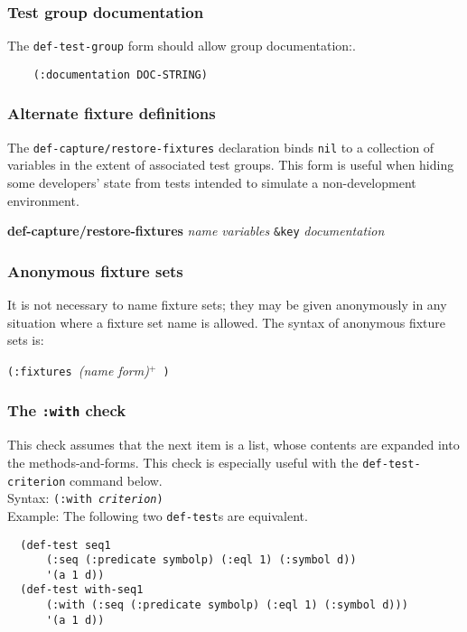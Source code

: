 \subsubsection{Test group documentation}
The \texttt{def-test-group} form should allow group
documentation:.
\begin{verbatim}
    (:documentation DOC-STRING)
\end{verbatim}

\subsubsection{Alternate fixture definitions}
The
\texttt{def-capture/restore-fixtures}
declaration binds \texttt{nil} to a collection of variables in the
extent of associated test groups.  This form is useful when hiding
some developers' state from tests intended to simulate a
non-development environment.
\begin{center}
\textbf{def-capture/restore-fixtures}
 \textit{name} \textit{variables}
\texttt{\&key} \textit{documentation}
\end{center}

\subsubsection{Anonymous fixture sets}
It is not necessary to name fixture sets; they may be given
anonymously in any situation where a fixture set name is allowed.  The
syntax of anonymous fixture sets
is:
\begin{center}
\texttt{(:fixtures }\textit{(name form)}$^+$\texttt{ )}
\end{center}

\subsubsection{The \texttt{:with} check}
This check assumes that the next item is a list, whose contents are
expanded into the methods-and-forms. This
check is especially useful with the \texttt{def-test-cri\-ter\-ion}
command below.
\\ Syntax: \texttt{(:with \emph{criterion})}
\\ Example: The following two \texttt{def-test}s are equivalent.
\begin{verbatim}
  (def-test seq1
      (:seq (:predicate symbolp) (:eql 1) (:symbol d))
      '(a 1 d))
  (def-test with-seq1
      (:with (:seq (:predicate symbolp) (:eql 1) (:symbol d)))
      '(a 1 d))
\end{verbatim}

